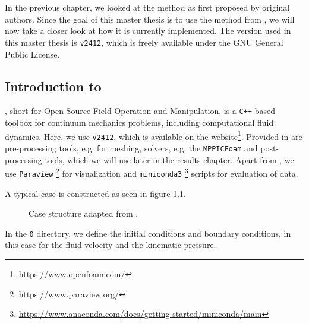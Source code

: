 \chapter{\OF}
\label{ch:OpenFOAM}
In the previous chapter, we looked at the \MP method as first proposed by original authors.
Since the goal of this master thesis is to use the \MP method from \OFns, we will now take a closer look at how it is currently implemented.
The \OF version used in this master thesis is \texttt{v2412}, which is freely available under the GNU General Public License.

\section{Introduction to \OF}
\OFns, short for Open Source Field Operation and Manipulation, is a \lstinline|C++| based toolbox for continuum mechanics problems, including computational fluid dynamics. Here, we use \lstinline|v2412|, which is available on the \OF website\footnote{\url{https://www.openfoam.com/}}.
Provided in \OF are pre-processing tools, e.g. for meshing, solvers, e.g. the \lstinline|MPPICFoam| and post-processing tools, which we will use later in the results chapter. Apart from \OFns, we use \lstinline|Paraview| \footnote{\url{https://www.paraview.org/}} for visualization and \lstinline|miniconda3| \footnote{\url{https://www.anaconda.com/docs/getting-started/miniconda/main}} scripts for evaluation of data.

A typical \MP \OF case is constructed as seen in figure \ref{fig:fileStruc}. 
\begin{figure}
\caption{Case structure adapted from \cite{fileStruc}.}
\label{fig:fileStruc}
\end{figure}

In the \lstinline|0| directory, we define the initial conditions and boundary conditions, in this case for the fluid velocity and the kinematic pressure.


